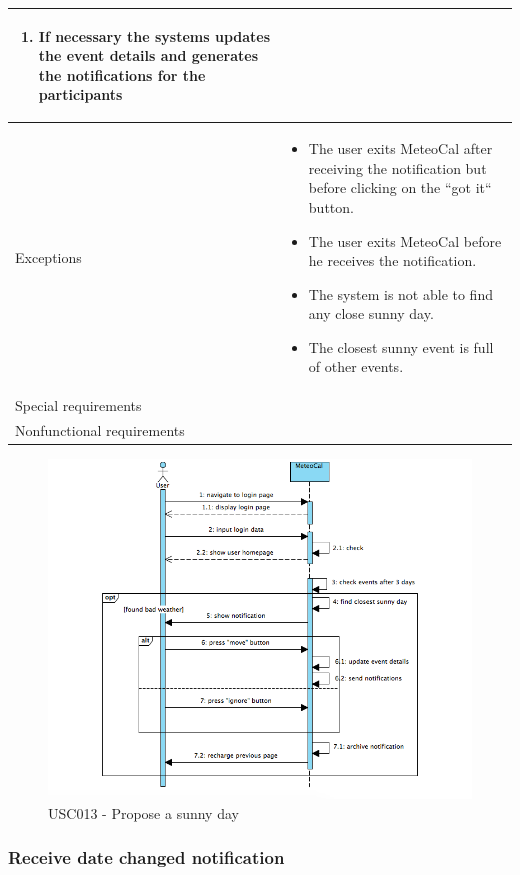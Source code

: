 \documentclass[10pt,a4paper,titlepage]{article}
\begin{document}
\begin{longtable}[h]{| p{3cm} | p{10cm} |}
\begin{enumerate}
\item If necessary the systems updates the event details and generates the notifications for the participants
\end{enumerate}\\ 
\hline Exceptions & \begin{itemize}
\item The user exits MeteoCal after receiving the notification but before clicking on the “got it“ button.
\item The user exits MeteoCal before he receives the notification.
\item The system is not able to find any close sunny day.
\item The closest sunny event is full of other events.
\end{itemize}\\ 
\hline Special requirements &\\ 
\hline Nonfunctional requirements &\\
\hline 
\end{longtable} 
\begin{figure}[h]
\centering
\includegraphics[width=\linewidth]{./Sequence_diag/USC013.png}
\caption[USC013]{USC013 - Propose a sunny day}
\label{fig:USC013}
\end{figure}

\clearpage
\subsubsection{Receive date changed notification} 
\end{document}
